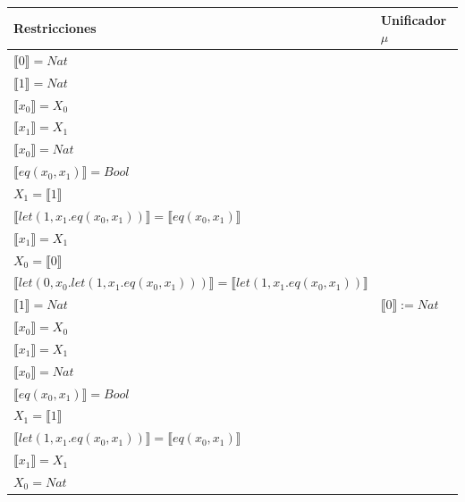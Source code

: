 \begin{exercise}
\begin{description}
                \begin{center}
                    \begin{longtable}{ | l | l | } 
                      \hline
                      Restricciones & Unificador $\mu$ \\ 
                        \hline
                        $ \llbracket 0 \rrbracket = Nat$  & \\
                        $ \llbracket 1 \rrbracket = Nat$  & \\
                        $ \llbracket x_0 \rrbracket = X_0$ & \\
                        $ \llbracket x_1 \rrbracket = X_1$  & \\
                        $ \llbracket x_0 \rrbracket = Nat$  & \\
                        $ \llbracket eq(x_0,x_1) \rrbracket = Bool$  & \\
                        $X_1 =  \llbracket 1 \rrbracket$ & \\
                        $ \llbracket let(1,x_1.eq(x_0,x_1)) \rrbracket =  \llbracket eq(x_0,x_1) \rrbracket$  & \\
                        $ \llbracket x_1 \rrbracket = X_1$  & \\
                        $X_0=  \llbracket 0 \rrbracket$ & \\
                        $ \llbracket let(0,x_0.let(1,x_1.eq(x_0,x_1))) \rrbracket =  \llbracket let(1,x_1.eq(x_0,x_1)) \rrbracket$ & \\
                      \hline
                        $ \llbracket 1 \rrbracket = Nat$  & $ \llbracket 0 \rrbracket := Nat$  \\
                        $ \llbracket x_0 \rrbracket = X_0$ & \\
                        $ \llbracket x_1 \rrbracket = X_1$  & \\
                        $ \llbracket x_0 \rrbracket = Nat$  & \\
                        $ \llbracket eq(x_0,x_1) \rrbracket = Bool$  & \\
                        $X_1 =  \llbracket 1 \rrbracket$ & \\
                        $ \llbracket let(1,x_1.eq(x_0,x_1)) \rrbracket =  \llbracket eq(x_0,x_1) \rrbracket$  & \\
                        $ \llbracket x_1 \rrbracket = X_1$  & \\
                        $X_0 = Nat$ & \\

\end{longtable}
\end{center}
\end{description}
\end{exercise}
